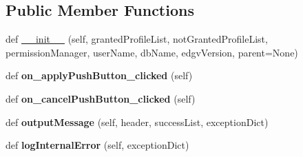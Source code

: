\subsection*{Public Member Functions}
\begin{DoxyCompactItemize}
\item 
def \mbox{\hyperlink{class_dsg_tools_1_1_user_tools_1_1db_profile_manager_1_1_db_profile_manager_a9b8628b6e71212c42a79c65664116db2}{\+\_\+\+\_\+init\+\_\+\+\_\+}} (self, granted\+Profile\+List, not\+Granted\+Profile\+List, permission\+Manager, user\+Name, db\+Name, edgv\+Version, parent=None)
\item 
\mbox{\label{class_dsg_tools_1_1_user_tools_1_1db_profile_manager_1_1_db_profile_manager_a4008e2aaa53e87eeb6947a68bc8f54ba}} 
def {\bfseries on\+\_\+apply\+Push\+Button\+\_\+clicked} (self)
\item 
\mbox{\label{class_dsg_tools_1_1_user_tools_1_1db_profile_manager_1_1_db_profile_manager_aa32614f767e3a0aaba2eb3255718aca9}} 
def {\bfseries on\+\_\+cancel\+Push\+Button\+\_\+clicked} (self)
\item 
\mbox{\label{class_dsg_tools_1_1_user_tools_1_1db_profile_manager_1_1_db_profile_manager_a22bb4d87e92c277ad5c302a3954e3c7c}} 
def {\bfseries output\+Message} (self, header, success\+List, exception\+Dict)
\item 
\mbox{\label{class_dsg_tools_1_1_user_tools_1_1db_profile_manager_1_1_db_profile_manager_ac658997b97f8e88a3c2c0e0623c066ff}} 
def {\bfseries log\+Internal\+Error} (self, exception\+Dict)
\end{DoxyCompactItemize}

